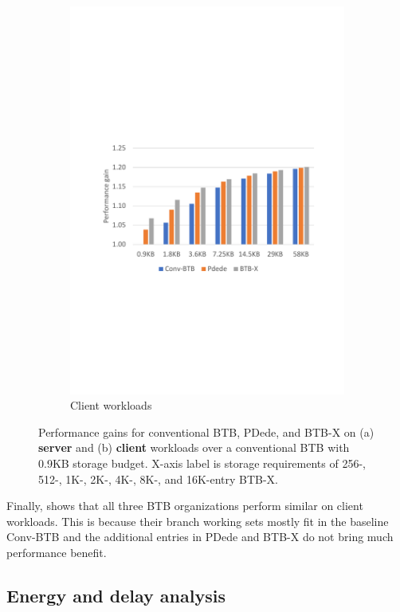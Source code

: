 \begin{figure}
\begin{subfigure}[t]{0.935\columnwidth}
        \includegraphics[width=0.935\columnwidth, trim=70 235 60 250, clip]{figures/ISOStorage_client_revised.pdf}
        \caption{Client workloads}
        \label{hpca:fig:clientPerf}
    \end{subfigure}
    \caption{Performance gains for conventional BTB, PDede, and BTB-X on (a) \textbf{server} and (b) \textbf{client} workloads over a conventional BTB with 0.9KB storage budget. X-axis label is storage requirements of 256-, 512-, 1K-, 2K-, 4K-, 8K-, and 16K-entry BTB-X.}\label{hpca:fig:perf}
\end{figure}

Finally,  shows that all three BTB organizations perform similar on client workloads. This is because their branch working sets mostly fit in the baseline Conv-BTB and the additional entries in PDede and BTB-X do not bring much performance benefit.

\subsection{Energy and delay analysis}

